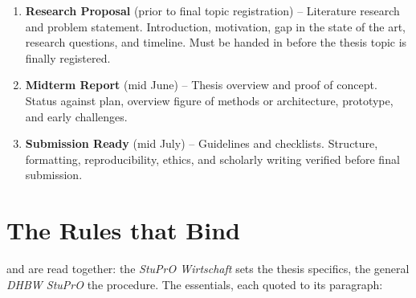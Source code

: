 \documentclass{../sharedAssets/tufte}
\begin{document}
\begin{enumerate}
    \item \textbf{Research Proposal} (prior to final topic registration) -- Literature
    research and problem statement.
    Introduction, motivation, gap in the state of the art, research questions, and
    timeline.
    Must be handed in before the thesis topic is finally registered.
    \item \textbf{Midterm Report} (mid June) -- Thesis overview and proof of concept.
    Status against plan, overview figure of methods or architecture, prototype, and early
    challenges.
    \item \textbf{Submission Ready} (mid July) -- Guidelines and checklists.
    Structure, formatting, reproducibility, ethics, and scholarly writing verified before
    final submission.
\end{enumerate}


\section{The Rules that Bind}
 and are read together: the \emph{StuPrO
Wirtschaft} sets the thesis specifics, the general \emph{DHBW StuPrO} the procedure.
The essentials, each quoted to its paragraph:
\end{document}
